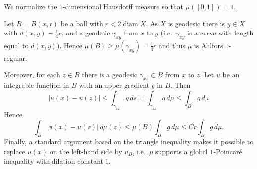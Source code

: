 \documentclass[a4paper,twoside]{article}
\makeatletter
\theoremstyle{propositional}
\theoremstyle{descriptive}
\theoremstyle{remarkstyle}
\renewenvironment{proof}[1][\proofname]{\par
  \pushQED{\qed}%
  \normalfont
  \trivlist
  \item[\hskip\labelsep
        \itshape
    #1\@addpunct{.}]\ignorespaces
}{%
  \popQED\endtrivlist\@endpefalse
}
\DeclareMathOperator{\diam}{diam}
\newcommand{\ga}{\gamma}
\numberwithin{equation}{section}
\makeatother
\begin{document}
We normalize the $1$-dimensional Hausdorff measure  so that $\mu([0,1])=1$.


\begin{proof}
Let $B=B(x,r)$ be a ball with $r < 2 \diam X$.
As $X$ is geodesic there is $y \in X$ with $d(x,y) = \tfrac14 r$,
and a geodesic $\ga_{xy}$ from $x$ to $y$
(i.e.\ $\ga_{xy}$ is a curve with length equal to $d(x,y)$).
Hence $\mu(B)  \ge \mu(\ga_{xy}) = \tfrac14 r$
and thus $\mu$ is Ahlfors $1$-regular.


Moreover, for each $z \in B$ there is a geodesic $\ga_{xz} \subset B$ from $x$ to $z$.
Let $u$ be an 
integrable function  in $B$ with an upper gradient $g$ in $B$.
Then
\[
|u(x)-u(z)| \le  \int_{\ga_{xz}} g \, ds
    = \int_{\ga_{xz}} g \,d\mu
    \le  \int_{B} g \,d\mu
\]
Hence
\[
\int_{B} |u(x)-u(z)|\,d\mu(z)
  \le \mu(B) \int_{B} g \,d\mu
  \le Cr \int_{B} g \,d\mu.
\]
Finally, a standard argument based on the triangle inequality
makes it possible to replace $u(x)$ 
on the left-hand side by $u_B$,
i.e.\ $\mu$ supports a global $1$-Poincar\'e inequality
with dilation constant $1$.
\end{proof}  
\end{document}
